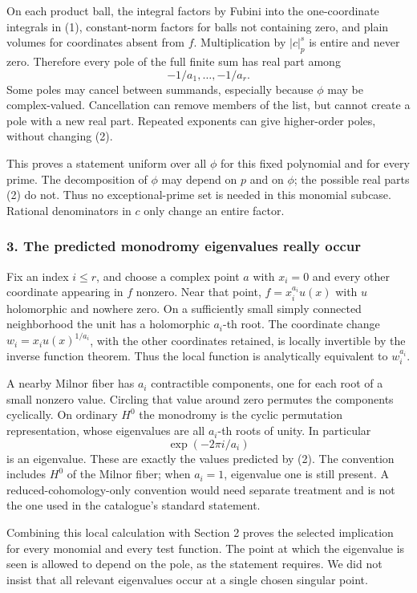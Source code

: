 \documentclass[11pt]{article}
\begin{document}
On each product ball, the integral factors by Fubini into the one-coordinate integrals in (1), constant-norm factors for balls not containing zero, and plain volumes for coordinates absent from $f$. Multiplication by $|c|_p^s$ is entire and never zero. Therefore every pole of the full finite sum has real part among
\[
 -1/a_1,\ldots,-1/a_r.                                \tag{2}
\]
Some poles may cancel between summands, especially because $\phi$ may be complex-valued. Cancellation can remove members of the list, but cannot create a pole with a new real part. Repeated exponents can give higher-order poles, without changing (2).

This proves a statement uniform over all $\phi$ for this fixed polynomial and for every prime. The decomposition of $\phi$ may depend on $p$ and on $\phi$; the possible real parts (2) do not. Thus no exceptional-prime set is needed in this monomial subcase. Rational denominators in $c$ only change an entire factor.

\subsubsection{3. The predicted monodromy eigenvalues really occur}
Fix an index $i\le r$, and choose a complex point $a$ with $x_i=0$ and every other coordinate appearing in $f$ nonzero. Near that point,
$f=x_i^{a_i}u(x)$ with $u$ holomorphic and nowhere zero. On a sufficiently small simply connected neighborhood the unit has a holomorphic $a_i$-th root. The coordinate change
$w_i=x_i u(x)^{1/a_i}$, with the other coordinates retained, is locally invertible by the inverse function theorem. Thus the local function is analytically equivalent to $w_i^{a_i}$.

A nearby Milnor fiber has $a_i$ contractible components, one for each root of a small nonzero value. Circling that value around zero permutes the components cyclically. On ordinary $H^0$ the monodromy is the cyclic permutation representation, whose eigenvalues are all $a_i$-th roots of unity. In particular
\[
 \exp(-2\pi i/a_i)
\]
is an eigenvalue. These are exactly the values predicted by (2). The convention includes $H^0$ of the Milnor fiber; when $a_i=1$, eigenvalue one is still present. A reduced-cohomology-only convention would need separate treatment and is not the one used in the catalogue's standard statement.

Combining this local calculation with Section 2 proves the selected implication for every monomial and every test function. The point at which the eigenvalue is seen is allowed to depend on the pole, as the statement requires. We did not insist that all relevant eigenvalues occur at a single chosen singular point.
\end{document}
